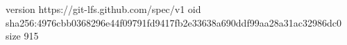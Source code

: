 version https://git-lfs.github.com/spec/v1
oid sha256:4976cbb0368296e44f09791fd9417fb2e33638a690ddf99aa28a31ac32986dc0
size 915
